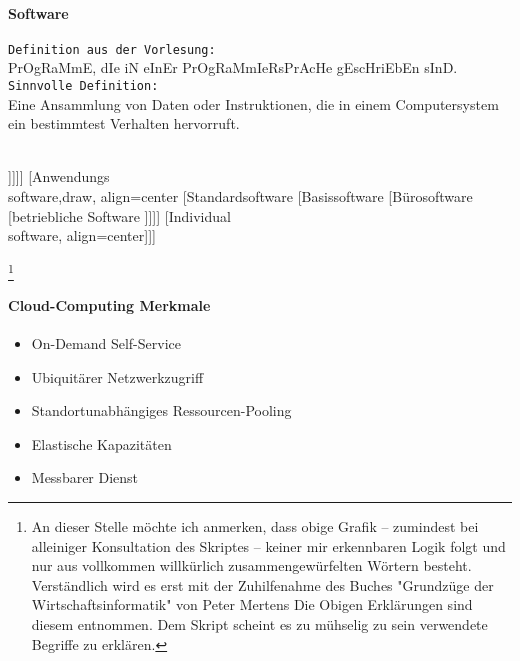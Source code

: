 \documentclass[twocolumn]{article}
\begin{document}
\paragraph{Software}
	\texttt{Definition aus der Vorlesung:} \\ 
	PrOgRaMmE, dIe iN eInEr PrOgRaMmIeRsPrAcHe gEscHriEbEn sInD. \\
	\texttt{Sinnvolle Definition:} \\
	Eine Ansammlung von Daten oder Instruktionen, die in einem Computersystem ein bestimmtest Verhalten hervorruft. \\\\
	\begin{flushleft}

	\begin{forest}
	[Software,draw 			
	[Systemsoftware,draw 
		[Betriebssystem
		[Übersetzungsprogramm \footnotemark
		[Dienstprogramme \footnotemark
		[Protokolle\footnotemark und Treiber\footnotemark ]]]]]
	[Anwendungs\\software,draw, align=center
		[Standardsoftware 
		[Basissoftware 
		[Bürosoftware 
		[betriebliche Software ]]]] 
		[Individual\\software, align=center]]]
	\end{forest}
	\end{flushleft}
\footnote{An dieser Stelle möchte ich anmerken, dass obige Grafik -- zumindest bei alleiniger Konsultation des Skriptes -- keiner mir erkennbaren Logik folgt und nur aus vollkommen willkürlich zusammengewürfelten Wörtern besteht. Verständlich wird es erst mit der Zuhilfenahme des Buches "Grundzüge der Wirtschaftsinformatik" von Peter Mertens Die Obigen Erklärungen sind diesem entnommen. Dem Skript scheint es zu mühselig zu sein verwendete Begriffe zu erklären.}

\paragraph{Cloud-Computing Merkmale}
	\begin{itemize}
		\item On-Demand Self-Service
		\item Ubiquitärer Netzwerkzugriff
		\item Standortunabhängiges Ressourcen-Pooling
		\item Elastische Kapazitäten
		\item Messbarer Dienst
	\end{itemize}
\end{document}
